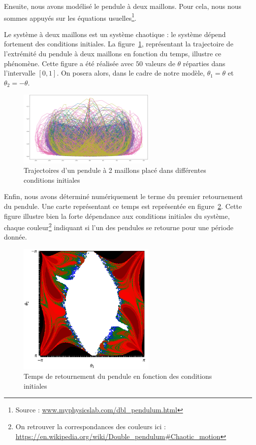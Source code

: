 Ensuite, nous avons modélisé le pendule à deux maillons. Pour cela, nous nous sommes appuyés sur les équations usuelles\footnote{Source : \url{www.myphysicslab.com/dbl_pendulum.html}}.
\vskip 1mm ~

Le système à deux maillons est un système chaotique : le système dépend fortement des conditions initiales. La figure~\ref{fig:chaos}, représentant la trajectoire de l'extrémité du pendule à deux maillons en fonction du temps, illustre ce phénomène. Cette figure a été réalisée avec $50$ valeurs de $\theta$ réparties dans l'intervalle $[0,1]$. On posera alors, dans le cadre de notre modèle, $\theta_1 = \theta$ et $\theta_2 = -\theta$.

\begin{figure}[ht]
	\centering
	\includegraphics[width=0.6\textwidth]{img/chaos}
	\caption{Trajectoires d'un pendule à 2 maillons placé dans différentes conditions initiales}
	\label{fig:chaos}
\end{figure}

Enfin, nous avons déterminé numériquement le terme du premier retournement du pendule. Une carte représentant ce temps est représentée en figure~\ref{fig:flip_time}. Cette figure illustre bien la forte dépendance aux conditions initiales du système, chaque couleur\footnote{On retrouver la correspondances des couleurs ici : \url{https://en.wikipedia.org/wiki/Double\_pendulum\#Chaotic\_motion}} indiquant si l'un des pendules se retourne pour une période donnée.

\begin{figure}[H]
	\centering
	\includegraphics[width=0.60\textwidth]{img/flip_time_300x300}
	\caption{Temps de retournement du pendule en fonction des conditions initiales}
	\label{fig:flip_time}
\end{figure}